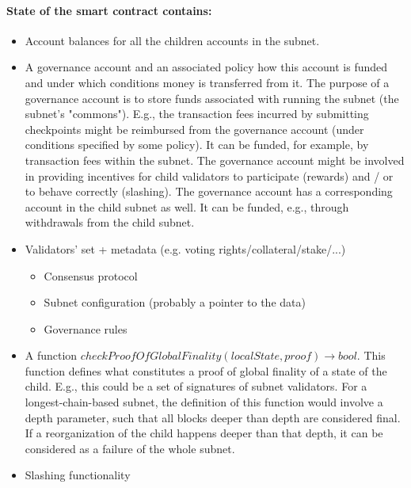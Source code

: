 \paragraph{State of the smart contract contains:}
\begin{itemize}
    \item Account balances for all the children accounts in the subnet.
    \item A governance account and an associated policy how this account is funded and under which conditions money is transferred from it.
        The purpose of a governance account is to store funds associated with running the subnet (the subnet's "commons"). E.g., the transaction fees incurred by submitting checkpoints might be reimbursed from the governance account (under conditions specified by some policy). It can be funded, for example, by transaction fees within the subnet. The governance account might be involved in providing incentives for child validators to participate (rewards) and / or to behave correctly (slashing). The governance account has a corresponding account in the child subnet as well. It can be funded, e.g., through withdrawals from the child subnet.
    \item Validators' set + metadata (e.g. voting rights/collateral/stake/...)
    \begin{itemize}
        \item Consensus protocol
        \item Subnet configuration (probably a pointer to the data)
        \item Governance rules
    \end{itemize}
    \item A function $checkProofOfGlobalFinality(localState, proof)\rightarrow bool$. This function defines what constitutes a proof of global finality of a state of the child.
        E.g., this could be a set of signatures of subnet validators. For a longest-chain-based subnet, the definition of this function would involve a depth parameter, such that all blocks deeper than depth are considered final. If a reorganization of the child happens deeper than that depth, it can be considered as a failure of the whole subnet.
    \item Slashing functionality 
\end{itemize}

